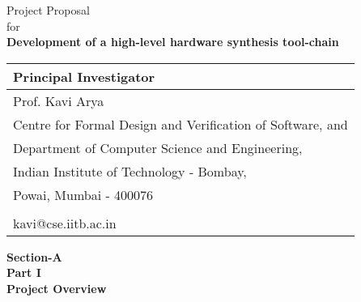 \documentclass[12pt]{article}
\begin{document}
\newcommand{\setsr}[1]{\setcounter{srno}{#1}}

\newcommand{\incten}[0]{\setcounter{srinc}{10}}
\newcommand{\incone}[0]{\setcounter{srinc}{1}}

\newcommand{\srno}[2][\arabic{srno}]{\noindent\paragraph{#1. #2}\addtocounter{srno}{\value{srinc}}}

\incone
\setsr{100}

\newcommand{\mytitle}{Development of a high-level hardware synthesis
  tool-chain}

\begin{titlepage}
\begin{large}
\begin{center}
\vspace{0.5cm}
Project Proposal\\
\vspace{0.5cm}
for\\
\vspace{0.5cm}
{\Large \bf \mytitle}\\
\vspace{2.5cm}
\begin{tabular}{l}
\hline
{\bf Principal Investigator}\\
\hline
Prof. Kavi Arya\\
Centre for Formal Design and Verification of Software, and\\
Department of Computer Science and Engineering,\\
Indian Institute of Technology - Bombay,\\
Powai, Mumbai - 400076\\
\\
kavi@cse.iitb.ac.in\\
\hline
\end{tabular}
\end{center}
\end{large}
\end{titlepage}


\begin{center}
  \bf \Large Section-A\\
  \large Part I\\
  \vspace{2ex}
  Project Overview\\
\end{center}
\end{document}
